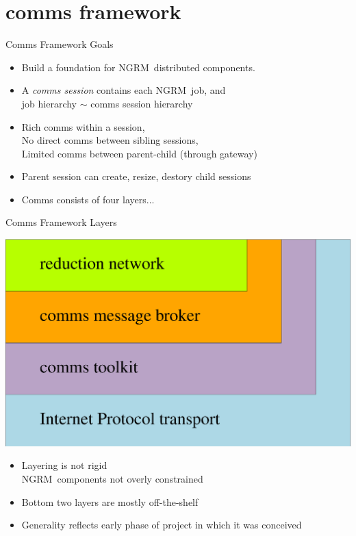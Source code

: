 \documentclass[default,pdf,colorBG,slideColor]{prosper}
\newcommand{\ngrm}{NGRM}
\begin{document}
\part{comms framework}
\begin{slide}{Comms Framework Goals}{\small
\begin{itemize}
  \item{Build a foundation for \ngrm\ distributed components.}
  \item{A {\em comms session} contains each \ngrm\ job, and \\
	job hierarchy $\sim$ comms session hierarchy}
  \item{Rich comms within a session,\\
	No direct comms between sibling sessions,\\
        Limited comms between parent-child (through gateway)}
  \item{Parent session can create, resize, destory child sessions}
  \item{Comms consists of four layers...}
\end{itemize}
}\end{slide}
\begin{slide}{Comms Framework Layers}{\small
\begin{center}
  \includegraphics[scale=0.20]{comms}
\end{center}
\begin{itemize}
  \item{Layering is not rigid\\
        \ngrm\ components not overly constrained}
  \item{Bottom two layers are mostly off-the-shelf}
  \item{Generality reflects early phase of project in which it was conceived}
\end{itemize}
}\end{slide}
\end{document}
